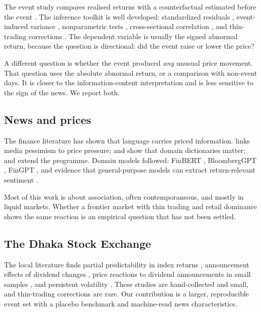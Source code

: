 \documentclass[10pt,twocolumn,a4paper]{article}
\begin{document}
The event study compares realised returns with a counterfactual estimated before the event
\citep{ffjr1969,mackinlay1997}. The inference toolkit is well developed: standardized residuals
\citep{patell1976}, event-induced variance \citep{boehmer1991}, nonparametric tests \citep{corrado1989},
cross-sectional correlation \citep{kolari2010}, and thin-trading corrections
\citep{dimson1979,scholes1977}. The dependent variable is usually the signed abnormal return, because
the question is directional: did the event raise or lower the price?

A different question is whether the event produced \emph{any} unusual price movement. That question
uses the absolute abnormal return, or a comparison with non-event days. It is closer to the
information-content interpretation and is less sensitive to the sign of the news. We report both.

\subsection{News and prices}

The finance literature has shown that language carries priced information. \citet{tetlock2007} links
media pessimism to price pressure; \citet{tetlock2008} and \citet{loughran2011} show that domain
dictionaries matter; \citet{bollen2011} and \citet{gentzkow2019} extend the programme. Domain models
followed: FinBERT \citep{huang2023finbert}, BloombergGPT \citep{wu2023}, FinGPT \citep{yang2023fingpt},
and evidence that general-purpose models can extract return-relevant sentiment
\citep{lopezlira2023}.

Most of this work is about association, often contemporaneous, and mostly in liquid markets. Whether a
frontier market with thin trading and retail dominance shows the same reaction is an empirical question
that has not been settled.

\subsection{The Dhaka Stock Exchange}

The local literature finds partial predictability in index returns \citep{mollik2009,zaman2019},
announcement effects of dividend changes \citep{rabbani2017}, price reactions to dividend announcements
in small samples \citep{zahan2020}, and persistent volatility \citep{aziz2015}. These studies are
hand-collected and small, and thin-trading corrections are rare. Our contribution is a larger,
reproducible event set with a placebo benchmark and machine-read news characteristics.
\end{document}
